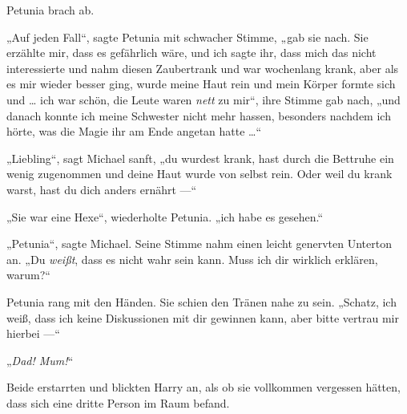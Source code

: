 Petunia brach ab.

„Auf jeden Fall“, sagte Petunia mit schwacher Stimme, „gab sie nach. Sie erzählte mir, dass es gefährlich wäre, und ich sagte ihr, dass mich das nicht interessierte und nahm diesen Zaubertrank und war wochenlang krank, aber als es mir wieder besser ging, wurde meine Haut rein und mein Körper formte sich und … ich war schön, die Leute waren \emph{nett} zu mir“, ihre Stimme gab nach, „und danach konnte ich meine Schwester nicht mehr hassen, besonders nachdem ich hörte, was die Magie ihr am Ende angetan hatte …“

„Liebling“, sagt Michael sanft, „du wurdest krank, hast durch die Bettruhe ein wenig zugenommen und deine Haut wurde von selbst rein. Oder weil du krank warst, hast du dich anders ernährt —“

„Sie war eine Hexe“, wiederholte Petunia. „ich habe es gesehen.“

„Petunia“, sagte Michael. Seine Stimme nahm einen leicht genervten Unterton an.
„Du \emph{weißt}, dass es nicht wahr sein kann. Muss ich dir wirklich erklären, warum?“

Petunia rang mit den Händen. Sie schien den Tränen nahe zu sein.
„Schatz, ich weiß, dass ich keine Diskussionen mit dir gewinnen kann, aber bitte vertrau mir hierbei —“

„\emph{Dad! Mum!}“

Beide erstarrten und blickten Harry an, als ob sie vollkommen vergessen hätten, dass sich eine dritte Person im Raum befand.

